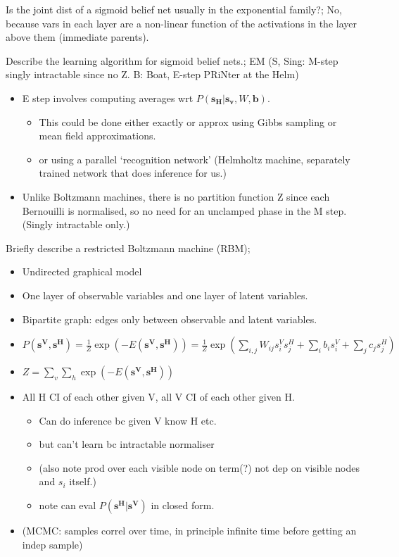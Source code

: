 \documentclass{article}
\begin{document}
Is the joint dist of a sigmoid belief net usually in the exponential family?; No, because vars in each layer are a non-linear function of the activations in the layer above them (immediate parents).

Describe the learning algorithm for sigmoid belief nets.; EM (S, Sing: M-step singly intractable since no Z. B: Boat, E-step PRiNter at the Helm) \begin{itemize} \item E step involves computing averages wrt $P(\mathbf{s_H | s_v}, W, \mathbf{b})$.  \begin{itemize} \item This could be done either exactly or approx using Gibbs sampling or mean field approximations. \item or using a parallel `recognition network' (Helmholtz machine, separately trained network that does inference for us.) \end{itemize} \item Unlike Boltzmann machines, there is no partition function Z since each Bernouilli is normalised, so no need for an unclamped phase in the M step. (Singly intractable only.) \end{itemize}

Briefly describe a restricted Boltzmann machine (RBM); \begin{itemize} \item Undirected graphical model \item One layer of observable variables and one layer of latent variables. \item Bipartite graph: edges only between observable and latent variables. \item $P(\mathbf{s^V}, \mathbf{s^H}) = \frac{1}{Z}\exp(-E(\mathbf{s^V, s^H})) =\frac{1}{Z}\exp(\sum_{i,j}W_{ij}s^V_is^H_j + \sum_i b_is^V_i + \sum_j c_js^H_j)$ \item $Z = \sum_v \sum_h \exp(-E(\mathbf{s^V, s^H}))$ \item All H CI of each other given V, all V CI of each other given H. \begin{itemize} \item Can do inference bc given V know H etc. \item but can't learn bc intractable normaliser \item (also note prod over each visible node on term(?) not dep on visible nodes and $s_i$ itself.) \item note can eval $P(\mathbf{s^H|s^V})$ in closed form. \end{itemize}\item (MCMC: samples correl over time, in principle infinite time before getting an indep sample)  \end{itemize}
\end{document}
